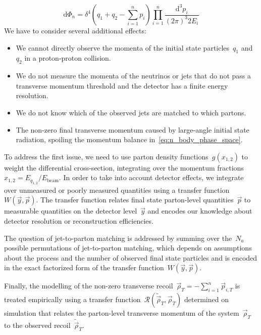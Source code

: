\begin{equation}
\label{eq:n_body_phase_space}
\mathrm{d}\Phi_n = \delta^4 (q_1 + q_2 - \sum_{i=1}^n p_i) \prod_{i=1}^n \frac{\mathrm{d}^3 p_i}{(2\pi)^3 2 E_i}
\end{equation}
We have to consider several additional effects:
\begin{itemize}
\item We cannot directly observe the momenta of the initial state particles~$q_1$ and~$q_2$ in a proton-proton collision.
\item We do not measure the momenta of the neutrinos or jets that do not pass a transverse momentum threshold and the detector has a finite energy resolution.
\item We do not know which of the observed jets are matched to which partons.
\item The non-zero final transverse momentum caused by large-angle initial state radiation, spoiling the momentum balance in~\cref{eq:n_body_phase_space}.
\end{itemize}

To address the first issue, we need to use parton density functions~$g(x_{1,2})$ to weight the differential cross-section, integrating over the momentum fractions~$x_{1,2} = E_{q_{1,2}}/E_{\mathrm{beam}}$.
In order to take into account detector effects, we integrate over unmeasured or poorly measured quantities using a transfer function~$W(\vec{y}, \vec{p})$.
The transfer function relates final state parton-level quantities~$\vec{p}$ to measurable quantities on the detector level~$\vec{y}$ and encodes our knowledge about detector resolution or reconstruction efficiencies.

The question of jet-to-parton matching is addressed by summing over the~$N_a$ possible permutations of jet-to-parton matching, which depends on assumptions about the process and the number of observed final state particles and is encoded in the exact factorized form of the transfer function~$W(\vec{y}, \vec{p})$.

Finally, the modelling of the non-zero transverse recoil~$\vec{\rho}_T = -\sum_{i=1}^n \vec{p}_{i,T}$ is treated empirically using a transfer function~$\mathcal{R}(\tilde{\vec{\rho}}_T, \vec{\rho}_T)$ determined on simulation that relates the parton-level transverse momentum of the system~$\vec{\rho}_T$ to the observed recoil~$\tilde{\vec{\rho}}_T$. 

